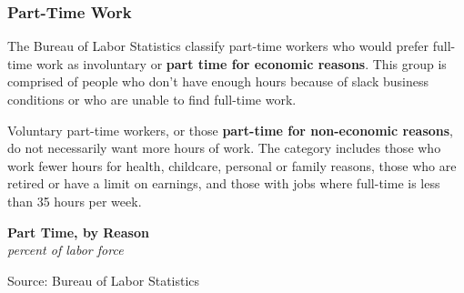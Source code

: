 \documentclass{report}
\makeatletter
\newcommand{\tbllink}[1]{\href{https://raw.githubusercontent.com/bdecon/US-chartbook/master/chartbook/data/#1}{\faTable}}
\newcommand*\short[1]{\expandafter\@gobbletwo\number\numexpr#1\relax}
\newcommand{\absnode}[3]{\node[below right, align=left] at (axis cs: #1,#2) {#3};}
\newcommand{\shdateaxisticks}{
		date coordinates in=x, axis line style={draw=none},
		xmax={2024-01-31},
		max space between ticks=40,	    
		xtick={{1990-01-01}, {1995-01-01}, {2000-01-01}, 
			{2005-01-01}, {2010-01-01}, {2015-01-01}, {2020-01-01}},
		minor xtick={},
		enlarge y limits={0.06}, enlarge x limits={0.01},
		xticklabel style={align=center, yshift=-2pt}, tick label style={inner sep=0pt},
		}
\newcommand{\bbar}[2]{extra #1 ticks = {{#2}}, extra #1 tick labels = ,
		extra #1 tick style = {grid=major, grid style={thick, black!25}},}
\newcommand{\stdline}[4]{\addplot[very thick, no markers, color=#1] 
		table [x=#2, y=#3, col sep=comma] {#4};	}
\newcommand{\rebars}{
		\fill[color=black!10] (axis cs:{2007-12-01},\pgfkeysvalueof{/pgfplots/ymin}) 
			rectangle (axis cs:{2009-07-01}, \pgfkeysvalueof{/pgfplots/ymax});
		\fill[color=black!10] (axis cs:{2001-03-01},\pgfkeysvalueof{/pgfplots/ymin}) 
			rectangle (axis cs:{2001-11-01}, \pgfkeysvalueof{/pgfplots/ymax});
		\fill[color=black!10] (axis cs:{2020-02-01},\pgfkeysvalueof{/pgfplots/ymin}) 
			rectangle (axis cs:{2020-05-01}, \pgfkeysvalueof{/pgfplots/ymax});}
\makeatother
\begin{document}
{\begin{minipage}{1.0\textwidth}
\subsubsection*{Part-Time Work}
\small  The Bureau of Labor Statistics classify part-time workers who would prefer full-time work as involuntary or \textbf{part time for economic reasons}. This group is comprised of people who don't have enough hours because of slack business conditions or who are unable to find full-time work. 

Voluntary part-time workers, or those \textbf{part-time for non-economic reasons}, do not necessarily want more hours of work. The category includes those who work fewer hours for health, childcare, personal or family reasons, those who are retired or have a limit on earnings, and those with jobs where full-time is less than 35 hours per week. 
\end{minipage}

\begin{minipage}{0.43\textwidth}
\normalsize \textbf{Part Time, by Reason}\\
\footnotesize{\textit{percent of labor force}}
\vspace{4.2cm}

\hspace{2mm} 

\footnotesize{Source: Bureau of Labor Statistics} \hfill \tbllink{parttime.csv} \ \ 
\end{minipage}\hspace{5mm}
\begin{minipage}{0.29\textwidth}
\small 
\end{minipage}
\vspace{1mm}

}
\end{document}
